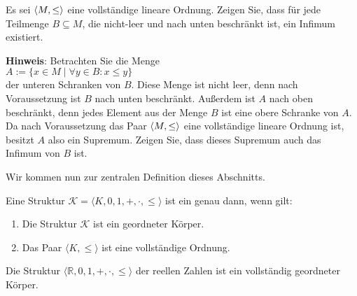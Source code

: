 \exercise
Es sei $\pair(M, \leq)$ eine vollständige lineare Ordnung.  Zeigen Sie, dass für jede Teilmenge
$B \subseteq M$, die nicht-leer und nach unten beschränkt ist, ein Infimum existiert.
\vspace*{0.2cm}

\noindent
\textbf{Hinweis}: Betrachten Sie die Menge
\\[0.2cm]
\hspace*{1.3cm}
$A := \{ x \in M \mid \forall y \in B: x \leq y \}$
\\[0.2cm]
der unteren Schranken von $B$.  Diese Menge ist nicht leer, denn nach Voraussetzung ist $B$ nach
unten beschränkt.  Außerdem ist $A$ nach oben beschränkt, denn jedes Element aus der Menge $B$ ist
eine obere Schranke von $A$.  Da nach Voraussetzung das Paar $\pair(M, \leq)$ eine vollständige
lineare Ordnung ist, besitzt $A$ also ein Supremum.  Zeigen Sie, dass dieses Supremum auch das
Infimum von $B$ ist. \eox

Wir kommen nun zur zentralen Definition dieses Abschnitts.
\begin{Definition} \hspace*{\fill} \linebreak
  Eine Struktur  $\mathcal{K} = \langle K, 0, 1, +, \cdot, \leq \rangle$  ist ein 
   genau dann, wenn gilt:
  \begin{enumerate}
  \item Die Struktur $\mathcal{K}$ ist ein geordneter Körper.
  \item Das Paar $\langle K, \leq \rangle$ ist eine vollständige Ordnung. \edx
  \end{enumerate}
\end{Definition}

\begin{Theorem}
  Die Struktur $\langle \mathbb{R}, 0, 1, +, \cdot, \leq \rangle$ der reellen Zahlen ist ein  vollständig geordneter Körper.   \edx
\end{Theorem}

